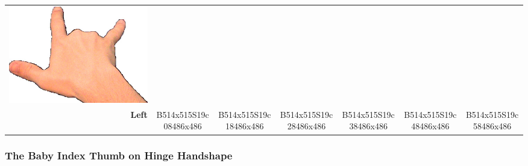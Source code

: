 \documentclass{article}
\begin{document}
\begin{center}
\begin{tabular}{r*{6}{c}}
\includegraphics[scale=0.1]{images/06-09-6.jpg}\\
\textbf{Left}&
B514x515S19c08486x486&
B514x515S19c18486x486&
B514x515S19c28486x486&
B514x515S19c38486x486&
B514x515S19c48486x486&
B514x515S19c58486x486\\
\end{tabular}
\end{center}

\subsubsection{The Baby Index Thumb on Hinge Handshape}
\end{document}
